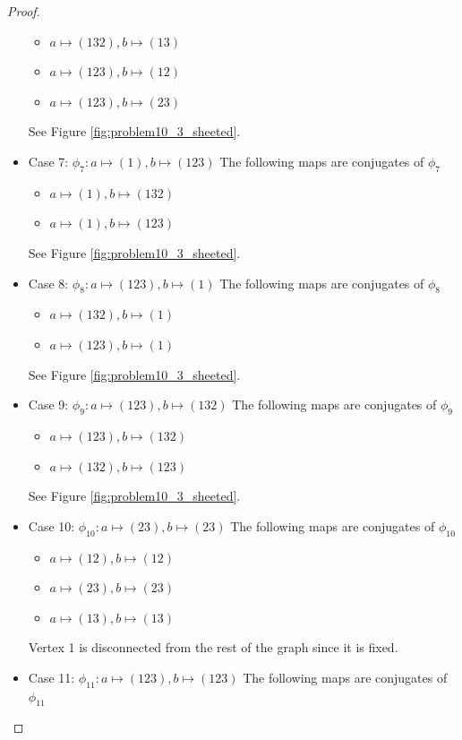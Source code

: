 \documentclass[12pt, psamsfonts]{amsart}
\theoremstyle{definition}
\theoremstyle{remark}
\numberwithin{equation}{section}
\begin{document}
\begin{proof}
\begin{itemize}
\begin{itemize}
        \item $a \mapsto (132), b \mapsto (13)$
        \item $a \mapsto (123), b \mapsto (12)$
        \item $a \mapsto (123), b \mapsto (23)$
      \end{itemize}
      See Figure \ref{fig:problem10_3_sheeted}.
    \item Case 7: $\phi_{7}: a \mapsto (1), b \mapsto (123)$
      The following maps are conjugates of $\phi_{7}$
      \begin{itemize}
        \item $a \mapsto (1), b \mapsto (132)$
        \item $a \mapsto (1), b \mapsto (123)$
      \end{itemize}
      See Figure \ref{fig:problem10_3_sheeted}.
    \item Case 8: $\phi_{8}: a \mapsto (123), b \mapsto (1)$
      The following maps are conjugates of $\phi_{8}$
      \begin{itemize}
        \item $a \mapsto (132), b \mapsto (1)$
        \item $a \mapsto (123), b \mapsto (1)$
      \end{itemize}
      See Figure \ref{fig:problem10_3_sheeted}.
    \item Case 9: $\phi_{9}: a \mapsto (123), b \mapsto (132)$
      The following maps are conjugates of $\phi_{9}$
      \begin{itemize}
        \item $a \mapsto (123), b \mapsto (132)$
        \item $a \mapsto (132), b \mapsto (123)$
      \end{itemize}
      See Figure \ref{fig:problem10_3_sheeted}.
    \item Case 10: $\phi_{10}: a \mapsto (23), b \mapsto (23)$
      The following maps are conjugates of $\phi_{10}$
      \begin{itemize}
        \item $a \mapsto (12), b \mapsto (12)$
        \item $a \mapsto (23), b \mapsto (23)$
        \item $a \mapsto (13), b \mapsto (13)$
      \end{itemize}
      Vertex 1 is disconnected from the rest of the graph since it is fixed.
    \item Case 11: $\phi_{11}: a \mapsto (123), b \mapsto (123)$
      The following maps are conjugates of $\phi_{11}$

\end{itemize}
\end{proof}
\end{document}
